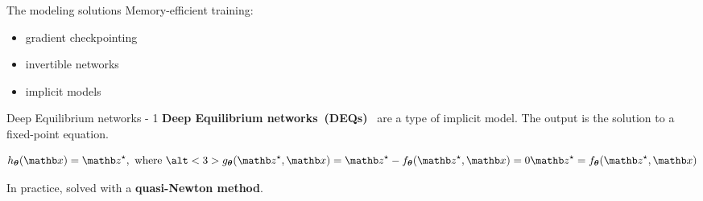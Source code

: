 \begin{frame}{The modeling solutions}
    Memory-efficient training:
    \begin{itemize}[<+->]
        \item gradient checkpointing~\citep{Chen2016TrainingCost}
        \item invertible networks~\citep{Gomez2017TheActivations,Sander2021MomentumNetworks}
        \item implicit models~\citep{Chen2018NeuralEquations,Bai2019DeepModels}
    \end{itemize}
\end{frame}

\begin{frame}{Deep Equilibrium networks - 1}
    \textbf{Deep Equilibrium networks~(DEQs)}~\citep{Bai2019DeepModels} are a type of implicit model.
    The output is the solution to a fixed-point equation.

    \begin{equation*}
        h_{\thetab}(\xb) = \zb^\star, \text{ where } \alt<3>{g_\thetab(\zb^\star, \xb) = \zb^\star - f_\thetab(\zb^\star, \xb) = 0}{\zb^\star = f_\thetab(\zb^\star, \xb)}
    \end{equation*}

    \pause

    In practice, solved with a \textbf{quasi-Newton method}.
\end{frame}


